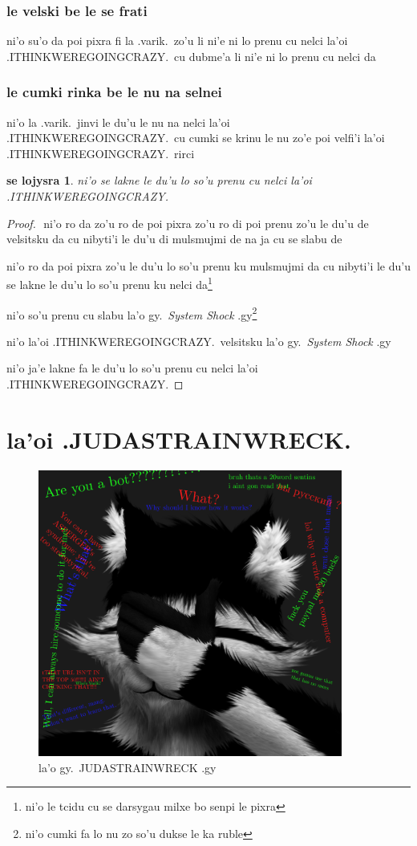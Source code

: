 \documentclass{report}
\newtheorem{thm}{se lojysra}
\begin{document}
\subsection{le velski be le se frati}
ni'o su'o da poi pixra fi la .varik.\ zo'u li ni'e ni lo prenu cu nelci la'oi .ITHINKWEREGOINGCRAZY.\ cu dubme'a li ni'e ni lo prenu cu nelci da

\subsection{le cumki rinka be le nu na selnei}
ni'o la .varik.\ jinvi le du'u le nu na nelci la'oi .ITHINKWEREGOINGCRAZY.\ cu cumki se krinu le nu zo'e poi velfi'i la'oi .ITHINKWEREGOINGCRAZY.\ rirci

\begin{thm}
ni'o se lakne le du'u lo so'u prenu cu nelci la'oi .ITHINKWEREGOINGCRAZY.

\end{thm}
\begin{proof}
${}$
ni'o ro da zo'u ro de poi pixra zo'u ro di poi prenu zo'u le du'u de velsitsku da cu nibyti'i le du'u di mulsmujmi de na ja cu se slabu de

ni'o ro da poi pixra zo'u le du'u lo so'u prenu ku mulsmujmi da cu nibyti'i le du'u se lakne le du'u lo so'u prenu ku nelci da\footnote{ni'o le tcidu cu se darsygau milxe bo senpi le pixra}

ni'o so'u prenu cu slabu la'o gy.\ \textit{System Shock} .gy\footnote{ni'o cumki fa lo nu zo so'u dukse le ka ruble}

ni'o la'oi .ITHINKWEREGOINGCRAZY.\ velsitsku la'o gy.\ \textit{System Shock} .gy

ni'o ja'e lakne fa le du'u lo so'u prenu cu nelci la'oi .ITHINKWEREGOINGCRAZY.

\end{proof}
\chapter{la'oi .JUDASTRAINWRECK.}
\begin{figure}[ht]
	\centering
	\includegraphics[width=10cm]{judastrainwreck/judastrainwreck.png}
	\caption[center]{la'o gy.\ JUDASTRAINWRECK .gy}
\end{figure}
\end{document}
